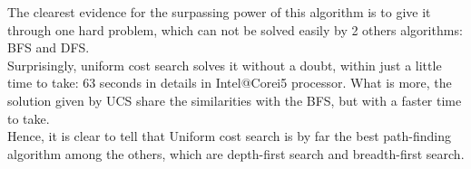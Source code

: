 \documentclass{article}
\begin{document}
The clearest evidence for the surpassing power of this algorithm is to give it through one hard problem, which can not be solved easily by 2 others algorithms: BFS and DFS.\\

Surprisingly, uniform cost search solves it without a doubt, within just a little time to take: 63 seconds in details in Intel@Corei5 processor. What is more, the solution given by UCS share the similarities with the BFS, but with a faster time to take.\\

Hence, it is clear to tell that Uniform cost search is by far the best path-finding algorithm among the others, which are depth-first search and breadth-first search.
\end{document}
